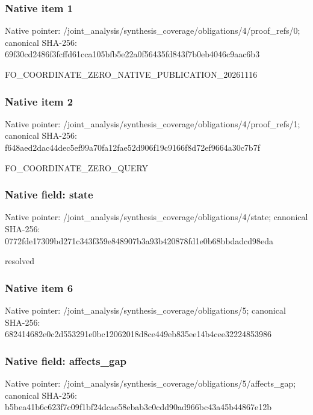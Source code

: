 \documentclass[10pt,a4paper]{article}
\begin{document}
\subsubsection{Native item 1}
Native pointer: /joint\_\allowbreak{}analysis/synthesis\_\allowbreak{}coverage/obligations/4/proof\_\allowbreak{}refs/0; canonical SHA-256: 69f30cd2486f3fcffd61cca105bfb5e22a0f56435fd843f7b0eb4046c9aac6b3

\begingroup\raggedright\sloppy FO\_\allowbreak{}COORDINATE\_\allowbreak{}ZERO\_\allowbreak{}NATIVE\_\allowbreak{}PUBLICATION\_\allowbreak{}20261116\par\endgroup

\subsubsection{Native item 2}
Native pointer: /joint\_\allowbreak{}analysis/synthesis\_\allowbreak{}coverage/obligations/4/proof\_\allowbreak{}refs/1; canonical SHA-256: f648aed2dac44dec5ef99a70fa12fae52d906f19c9166f8d72ef9664a30c7b7f

\begingroup\raggedright\sloppy FO\_\allowbreak{}COORDINATE\_\allowbreak{}ZERO\_\allowbreak{}QUERY\par\endgroup

\subsubsection{Native field: state}
Native pointer: /joint\_\allowbreak{}analysis/synthesis\_\allowbreak{}coverage/obligations/4/state; canonical SHA-256: 0772fde17309bd271c343f359e848907b3a93b420878fd1e0b68bbdadcd98eda

\begingroup\raggedright\sloppy resolved\par\endgroup

\subsubsection{Native item 6}
Native pointer: /joint\_\allowbreak{}analysis/synthesis\_\allowbreak{}coverage/obligations/5; canonical SHA-256: 682414682e0c2d553291e0bc12062018d8ce449eb835ee14b4cee32224853986

\subsubsection{Native field: affects\_\allowbreak{}gap}
Native pointer: /joint\_\allowbreak{}analysis/synthesis\_\allowbreak{}coverage/obligations/5/affects\_\allowbreak{}gap; canonical SHA-256: b5bea41b6c623f7c09f1bf24dcae58ebab3c0cdd90ad966bc43a45b44867e12b
\end{document}

